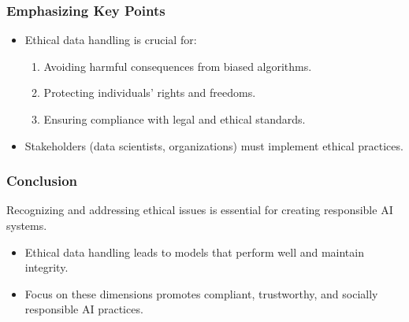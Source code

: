 \documentclass[aspectratio=169]{beamer}
\begin{document}
\begin{frame}[fragile]
    \frametitle{Emphasizing Key Points}
    \begin{itemize}
        \item Ethical data handling is crucial for:
        \begin{enumerate}
            \item Avoiding harmful consequences from biased algorithms.
            \item Protecting individuals' rights and freedoms.
            \item Ensuring compliance with legal and ethical standards.
        \end{enumerate}
        \item Stakeholders (data scientists, organizations) must implement ethical practices.
    \end{itemize}
\end{frame}

\begin{frame}[fragile]
    \frametitle{Conclusion}
    Recognizing and addressing ethical issues is essential for creating responsible AI systems.
    \begin{itemize}
        \item Ethical data handling leads to models that perform well and maintain integrity.
        \item Focus on these dimensions promotes compliant, trustworthy, and socially responsible AI practices.
    \end{itemize}
\end{frame}
\end{document}
